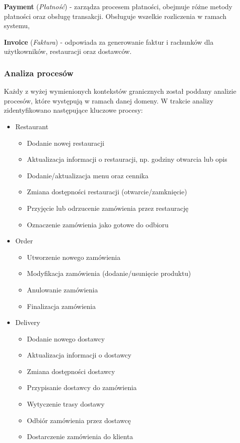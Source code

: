 \textbf{Payment} (\textit{Płatność}) - zarządza procesem płatności, obejmuje różne metody płatności oraz obsługę transakcji. Obsługuje wszelkie rozliczenia w ramach systemu,

\textbf{Invoice} (\textit{Faktura}) - odpowiada za generowanie faktur i rachunków dla użytkowników, restauracji oraz dostawców.

\subsubsection{Analiza procesów}

Każdy z wyżej wymienionych kontekstów granicznych został poddany analizie procesów, które występują w ramach danej domeny. W trakcie analizy zidentyfikowano następujące kluczowe procesy:

\begin{itemize}
    \item Restaurant
    \begin{itemize}
        \item Dodanie nowej restauracji
        \item Aktualizacja informacji o restauracji, np. godziny otwarcia lub opis
        \item Dodanie/aktualizacja menu oraz cennika
        \item Zmiana dostępności restauracji (otwarcie/zamknięcie)
        \item Przyjęcie lub odrzucenie zamówienia przez restaurację
        \item Oznaczenie zamówienia jako gotowe do odbioru
    \end{itemize}
    
    \item Order
    \begin{itemize}
        \item Utworzenie nowego zamówienia
        \item Modyfikacja zamówienia (dodanie/usunięcie produktu)
        \item Anulowanie zamówienia
        \item Finalizacja zamówienia
    \end{itemize}
    
    \item Delivery
    \begin{itemize}
        \item Dodanie nowego dostawcy
        \item Aktualizacja informacji o dostawcy
        \item Zmiana dostępności dostawcy
        \item Przypisanie dostawcy do zamówienia
        \item Wytyczenie trasy dostawy
        \item Odbiór zamówienia przez dostawcę
        \item Dostarczenie zamówienia do klienta
    \end{itemize}
    

\end{itemize}

